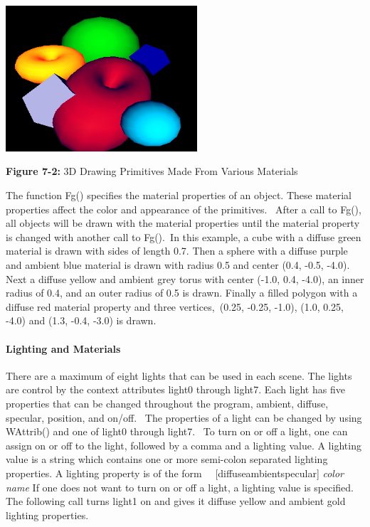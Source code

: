 
\includegraphics[width=2.8071in,height=2.1335in]{ub-img/ub-img32.png} 

{\sffamily\bfseries Figure 7-2:}
{\sffamily 3D Drawing Primitives Made From Various Materials}

\bigskip

The function Fg() specifies the material properties of an object. These
material properties affect the color and appearance of the primitives.
\ After a call to Fg(), all objects will be drawn with the material
properties until the material property is changed with another call to
Fg().\texttt{ }In this example, a cube with a diffuse green material is
drawn with sides of length 0.7. Then a sphere with a diffuse purple and
ambient blue material is drawn with radius 0.5 and center (0.4, -0.5,
-4.0). Next a diffuse yellow and ambient grey torus with center (-1.0,
0.4, -4.0), an inner radius of 0.4, and an outer radius of 0.5 is
drawn. Finally a filled polygon with a diffuse red material property
and three vertices,\texttt{ }(0.25, -0.25, -1.0), (1.0, 0.25, -4.0) and
(1.3, -0.4, -3.0) is drawn. 

\paragraph{Lighting and Materials}
There are a maximum of eight lights that can be used in each scene. The
lights are control by the context attributes light0 through light7.
Each light has five properties that can be changed throughout the
program, ambient, diffuse, specular, position, and on/off. \ The
properties of a light can be changed by using WAttrib() and one of
light0 through light7. \ To turn on or off a light, one can assign on
or off to the light, followed by a comma and a lighting value. A
lighting value is a string which contains one or more semi-colon
separated lighting properties. A lighting property is of the form
\newline
 \ \ [diffuse{\textbar}ambient{\textbar}specular] \textit{color
name}\newline
If one does not want to turn on or off a light, a lighting value is
specified. The following call turns light1 on and gives it diffuse
yellow and ambient gold lighting properties. 


